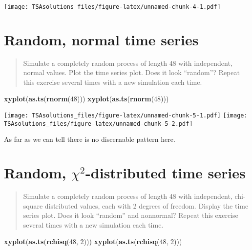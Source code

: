 \documentclass[]{book}
\newenvironment{Shaded}{\begin{snugshade}}{\end{snugshade}}
\newcommand{\KeywordTok}[1]{\textcolor[rgb]{0.13,0.29,0.53}{\textbf{{#1}}}}
\newcommand{\DecValTok}[1]{\textcolor[rgb]{0.00,0.00,0.81}{{#1}}}
\newcommand{\NormalTok}[1]{{#1}}
\theoremstyle{definition}
\theoremstyle{definition}
\theoremstyle{remark}
\begin{document}
\texttt{[image: TSAsolutions\_files/figure-latex/unnamed-chunk-4-1.pdf]}

\section{Random, normal time series}\label{random-normal-time-series}

\begin{quote}
Simulate a completely random process of length 48 with independent,
normal values. Plot the time series plot. Does it look ``random''?
Repeat this exercise several times with a new simulation each time.
\end{quote}

\begin{Shaded}
\begin{Highlighting}[]
\KeywordTok{xyplot}\NormalTok{(}\KeywordTok{as.ts}\NormalTok{(}\KeywordTok{rnorm}\NormalTok{(}\DecValTok{48}\NormalTok{)))}
\KeywordTok{xyplot}\NormalTok{(}\KeywordTok{as.ts}\NormalTok{(}\KeywordTok{rnorm}\NormalTok{(}\DecValTok{48}\NormalTok{)))}
\end{Highlighting}
\end{Shaded}

\texttt{[image: TSAsolutions\_files/figure-latex/unnamed-chunk-5-1.pdf]}
\texttt{[image: TSAsolutions\_files/figure-latex/unnamed-chunk-5-2.pdf]}

As far as we can tell there is no discernable pattern here.

\section{\texorpdfstring{Random, \(\chi^2\)-distributed time
series}{Random, \textbackslash{}chi\^{}2-distributed time series}}\label{random-chi2-distributed-time-series}

\begin{quote}
Simulate a completely random process of length 48 with independent,
chi-square distributed values, each with 2 degrees of freedom. Display
the time series plot. Does it look ``random'' and nonnormal? Repeat this
exercise several times with a new simulation each time.
\end{quote}

\begin{Shaded}
\begin{Highlighting}[]
\KeywordTok{xyplot}\NormalTok{(}\KeywordTok{as.ts}\NormalTok{(}\KeywordTok{rchisq}\NormalTok{(}\DecValTok{48}\NormalTok{, }\DecValTok{2}\NormalTok{)))}
\KeywordTok{xyplot}\NormalTok{(}\KeywordTok{as.ts}\NormalTok{(}\KeywordTok{rchisq}\NormalTok{(}\DecValTok{48}\NormalTok{, }\DecValTok{2}\NormalTok{)))}
\end{Highlighting}
\end{Shaded}
\end{document}
